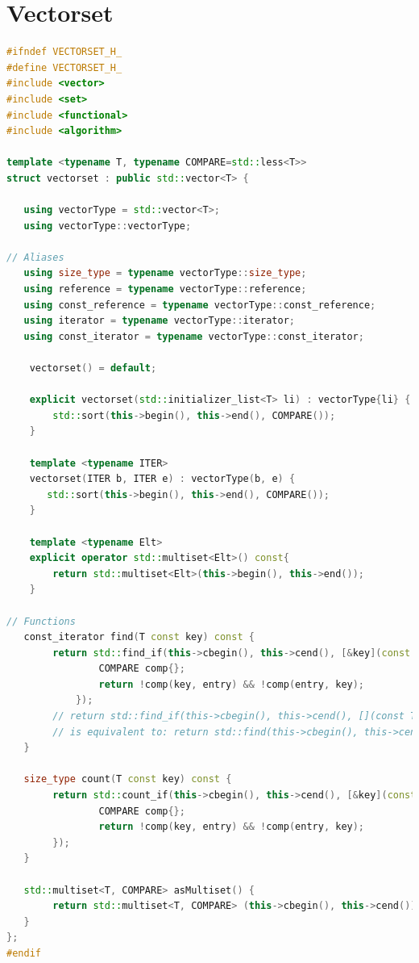 \section{Vectorset}
\begin{lstlisting}[language=C++]
#ifndef VECTORSET_H_
#define VECTORSET_H_
#include <vector>
#include <set>
#include <functional>
#include <algorithm>

template <typename T, typename COMPARE=std::less<T>>
struct vectorset : public std::vector<T> {

   using vectorType = std::vector<T>;
   using vectorType::vectorType;

// Aliases
   using size_type = typename vectorType::size_type;
   using reference = typename vectorType::reference;
   using const_reference = typename vectorType::const_reference;
   using iterator = typename vectorType::iterator;
   using const_iterator = typename vectorType::const_iterator;
   
    vectorset() = default;

    explicit vectorset(std::initializer_list<T> li) : vectorType{li} {
        std::sort(this->begin(), this->end(), COMPARE());
    }

    template <typename ITER>
    vectorset(ITER b, ITER e) : vectorType(b, e) {
       std::sort(this->begin(), this->end(), COMPARE());
    }

    template <typename Elt>
    explicit operator std::multiset<Elt>() const{
    	return std::multiset<Elt>(this->begin(), this->end());
    }

// Functions
   const_iterator find(T const key) const {
        return std::find_if(this->cbegin(), this->cend(), [&key](const T &entry) {
                COMPARE comp{};
                return !comp(key, entry) && !comp(entry, key);
            });
        // return std::find_if(this->cbegin(), this->cend(), [](const T &e) { return e == key; });
        // is equivalent to: return std::find(this->cbegin(), this->cend(), key)
   }

   size_type count(T const key) const {
        return std::count_if(this->cbegin(), this->cend(), [&key](const T &entry) {
                COMPARE comp{};
                return !comp(key, entry) && !comp(entry, key);
        });
   }

   std::multiset<T, COMPARE> asMultiset() {
        return std::multiset<T, COMPARE> (this->cbegin(), this->cend());
   }
};
#endif
\end{lstlisting}

